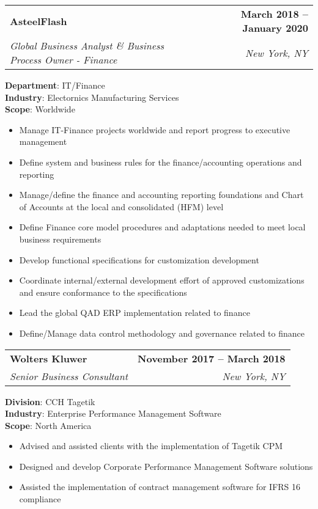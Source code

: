 \documentclass[letterpaper,11pt]{article}
\makeatletter
\newcommand{\resumeItem}[1]{
  \item\small{
    {#1 \vspace{-2pt}}
  }
}
\newcommand{\resumeSubheading}[4]{
  \vspace{-2pt}\item
    \begin{tabular*}{1.0\textwidth}[t]{l@{\extracolsep{\fill}}r}
      \textbf{#1} & \textbf{\small #2} \\
      \textit{\small#3} & \textit{\small #4} \\
    \end{tabular*}\vspace{-7pt}
}
\newcommand{\resumeItemListStart}{\begin{itemize}}
\newcommand{\resumeItemListEnd}{\end{itemize}\vspace{-5pt}}
\makeatother
\begin{document}
    \resumeSubheading
      {AsteelFlash}{March 2018 -- January 2020}
      {Global Business Analyst \& Business Process Owner - Finance}{New York, NY}
      \begin{itemize}[leftmargin=0.15in, label={}]
        \small{\item{
         \textbf{Department}{: IT/Finance} \\
         \textbf{Industry}{: Electornics Manufacturing Services} \\
         \textbf{Scope}{: Worldwide} \\
         }}
     \end{itemize}
      \resumeItemListStart
        \resumeItem{Manage IT-Finance projects worldwide and report progress to executive management}
        \resumeItem{Define system and business rules for the finance/accounting operations and reporting}
        \resumeItem{Manage/define the finance and accounting reporting foundations and Chart of Accounts at the local and consolidated (HFM) level}
        \resumeItem{Define Finance core model procedures and adaptations needed to meet local business requirements}
        \resumeItem{Develop functional specifications for customization development}
        \resumeItem{Coordinate internal/external development effort of approved customizations and ensure conformance to the specifications}
        \resumeItem{Lead the global QAD ERP implementation related to finance}
        \resumeItem{Define/Manage data control methodology and governance related to finance}
      \resumeItemListEnd

    \resumeSubheading
      {Wolters Kluwer}{November 2017 -- March 2018}
      {Senior Business Consultant}{New York, NY}
      \begin{itemize}[leftmargin=0.15in, label={}]
        \small{\item{
         \textbf{Division}{: CCH Tagetik} \\
         \textbf{Industry}{: Enterprise Performance Management Software} \\
         \textbf{Scope}{: North America} \\
         }}
     \end{itemize}
      \resumeItemListStart
        \resumeItem{Advised and assisted clients with the implementation of Tagetik CPM}
        \resumeItem{Designed and develop Corporate Performance Management Software solutions}
        \resumeItem{Assisted the implementation of contract management software for IFRS 16 compliance}
      \resumeItemListEnd
\end{document}
